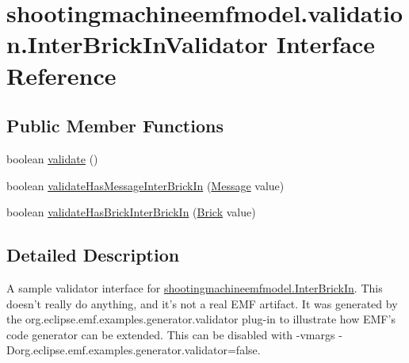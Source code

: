 \hypertarget{interfaceshootingmachineemfmodel_1_1validation_1_1_inter_brick_in_validator}{\section{shootingmachineemfmodel.\-validation.\-Inter\-Brick\-In\-Validator Interface Reference}
\label{interfaceshootingmachineemfmodel_1_1validation_1_1_inter_brick_in_validator}
}
\subsection*{Public Member Functions}
\begin{DoxyCompactItemize}
\item 
boolean \hyperlink{interfaceshootingmachineemfmodel_1_1validation_1_1_inter_brick_in_validator_af15749fd000b9fc0393c9af254058b9f}{validate} ()
\item 
boolean \hyperlink{interfaceshootingmachineemfmodel_1_1validation_1_1_inter_brick_in_validator_ada77f997f006fe02e2abbd000351a5e7}{validate\-Has\-Message\-Inter\-Brick\-In} (\hyperlink{interfaceshootingmachineemfmodel_1_1_message}{Message} value)
\item 
boolean \hyperlink{interfaceshootingmachineemfmodel_1_1validation_1_1_inter_brick_in_validator_a1ba31e1278cfcaaa762295822437e6a3}{validate\-Has\-Brick\-Inter\-Brick\-In} (\hyperlink{interfaceshootingmachineemfmodel_1_1_brick}{Brick} value)
\end{DoxyCompactItemize}


\subsection{Detailed Description}
A sample validator interface for \hyperlink{interfaceshootingmachineemfmodel_1_1_inter_brick_in}{shootingmachineemfmodel.\-Inter\-Brick\-In}. This doesn't really do anything, and it's not a real E\-M\-F artifact. It was generated by the org.\-eclipse.\-emf.\-examples.\-generator.\-validator plug-\/in to illustrate how E\-M\-F's code generator can be extended. This can be disabled with -\/vmargs -\/\-Dorg.\-eclipse.\-emf.\-examples.\-generator.\-validator=false. 

